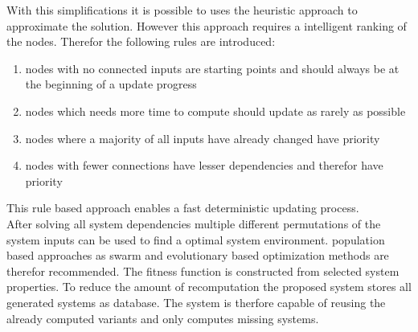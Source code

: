 With this simplifications it is possible to uses the heuristic approach to approximate the solution.
However this approach requires a intelligent ranking of the nodes.
Therefor the following rules are introduced:
\begin{enumerate}
    \item nodes with no connected inputs are starting points and should always be at the beginning of a update progress
    \item nodes which needs more time to compute should update as rarely as possible
    \item nodes where a majority of all inputs have already changed have priority
    \item nodes with fewer connections have lesser dependencies and therefor have priority
\end{enumerate}
This rule based approach enables a fast deterministic updating process.\\
After solving all system dependencies multiple different permutations of the system inputs can be used to find a optimal system environment.
population based approaches as swarm and evolutionary based optimization methods are therefor recommended.
The fitness function is constructed from selected system properties.
To reduce the amount of recomputation the proposed system stores all generated systems as database.
The system is therfore capable of reusing the already computed variants and only computes missing systems.
